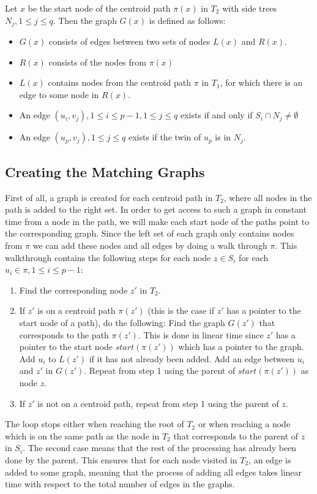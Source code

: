 Let $x$ be the start node of the centroid path $\pi(x)$ in $T_2$ with side trees $N_j, 1 \le j \le q$. Then the graph $G(x)$ is defined as follows:

\begin{itemize}
	\item $G(x)$ consists of edges between two sets of nodes $L(x)$ and $R(x)$.
	\item $R(x)$ consists of the nodes from $\pi(x)$
	\item $L(x)$ contains nodes from the centroid path $\pi$ in $T_1$, for which there is an edge to some node in $R(x)$.
	\item An edge $(u_i, v_j), 1 \le i \le p-1, 1 \le j \le q$ exists if and only if $S_i \cap N_j \ne \emptyset$
	\item An edge $(u_p, v_j), 1 \le j \le q$ exists if the twin of $u_p$ is in $N_j$.
\end{itemize}

\subsection{Creating the Matching Graphs}
First of all, a graph is created for each centroid path in $T_2$, where all nodes in the path is added to the right set. In order to get access to such a graph in constant time from a node in the path, we will make each start node of the paths point to the corresponding graph.
Since the left set of each graph only contains nodes from $\pi$ we can add these nodes and all edges by doing a walk through $\pi$. This walkthrough contains the following steps for each node $z \in S_i$ for each $u_i \in \pi, 1 \le i \le p-1$:

\begin{enumerate}
	\item Find the corresponding node $z'$ in $T_2$.
	\item If $z'$ is on a centroid path $\pi(z')$ (this is the case if $z'$ has a pointer to the start node of a path), do the following:
	\subitem Find the graph $G(z')$ that corresponds to the path $\pi(z')$. This is done in linear time since $z'$ has a pointer to the start node $start(\pi(z'))$ which has a pointer to the graph.
	\subitem Add $u_i$ to $L(z')$ if it has not already been added.
	\subitem Add an edge between $u_i$ and $z'$ in $G(z')$.
	\subitem Repeat from step 1 using the parent of $start(\pi(z'))$ as node $z$.
	\item If $z'$ is not on a centroid path, repeat from step 1 using the parent of $z$.
\end{enumerate}
The loop stops either when reaching the root of $T_2$ or when reaching a node which is on the same path as the node in $T_2$ that corresponds to the parent of $z$ in $S_i$. The second case means that the rest of the processing has already been done by the parent. This ensures that for each node visited in $T_2$, an edge is added to some graph, meaning that the process of adding all edges takes linear time with respect to the total number of edges in the graphs.

